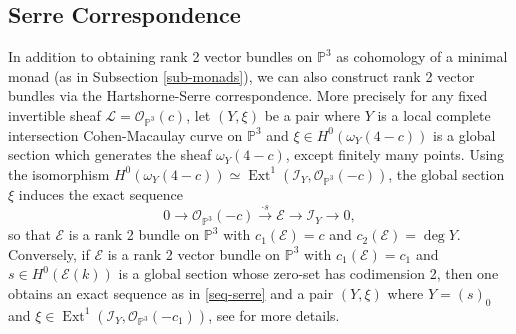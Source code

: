 \documentclass[twoside,reqno]{amsart}
\theoremstyle{plain}
\DeclareMathOperator{\Ext}{Ext}
\newcommand{\E}{\mathcal{E}}
\newcommand{\OO}{\mathcal{O}}
\begin{document}
\subsection{Serre Correspondence}
In addition to obtaining rank 2 vector bundles on $\mathbb{P}^3$ as cohomology of a minimal 
monad (as in Subsection \ref{sub-monads}), we can also construct rank 2 vector bundles via the Hartshorne-Serre 
correspondence. More precisely for any fixed invertible sheaf $\mathcal{L}=\OO_{\mathbb{P}^3}(c)$, let $(Y,\xi)$ be a 
pair where $Y$ is a local complete intersection Cohen-Macaulay curve on $\mathbb{P}^3$ and $\xi\in H^0(\omega_Y(4-c))$ is a 
global section which generates the sheaf $\omega_Y(4-c)$, except finitely many points.  Using 
the isomorphism $H^0(\omega_Y(4-c))\simeq\Ext^1(\mathcal{I}_Y,\mathcal{O}_{\mathbb{P}^3}(-c))$,
the global section $\xi$ induces the exact sequence 
\begin{equation}\label{seq-serre}
 0\rightarrow\mathcal{O}_{\mathbb{P}^3}(-c)\stackrel{\cdot s}{\rightarrow}\mathcal{E}\rightarrow\mathcal{I}_Y\rightarrow0,   
\end{equation}
so that $\mathcal{E}$ is a rank 2 bundle on $\mathbb{P}^3$ with 
$c_1(\mathcal{E})=c$ and $c_2(\mathcal{E})=\deg Y.$
Conversely, if $\mathcal{E}$ is a rank 2 vector bundle on $\mathbb{P}^3$ with $c_1(\mathcal{E})=c_1$ and 
$s\in H^0(\E(k))$ is a global section whose zero-set has codimension 2, then one obtains an exact 
sequence as in \eqref{seq-serre} and a pair $(Y,\xi)$ where $Y=(s)_0$ and 
$\xi\in\Ext^1(\mathcal{I}_Y,\mathcal{O}_{\mathbb{P}^3}(-c_1))$, see \cite[Theorem 4.1]{H80} for more details.\\




\end{document}

